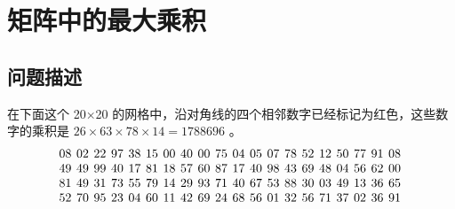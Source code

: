 \section{矩阵中的最大乘积}\label{sec:problem11}
\subsection{问题描述}
\begin{tcolorbox}
	在下面这个 20×20 的网格中，沿对角线的四个相邻数字已经标记为红色，这些数字的乘积是 \(  26 \times 63 \times 78 \times 14 = 1788696 \) 。
	\begin{equation*}
		\begin{array}{@{\hspace{4pt}}c@{\hspace{4pt}}c@{\hspace{4pt}}c@{\hspace{4pt}}c@{\hspace{4pt}}c@{\hspace{4pt}}c@{\hspace{4pt}}c@{\hspace{4pt}}c@{\hspace{4pt}}c@{\hspace{4pt}}c@{\hspace{4pt}}c@{\hspace{4pt}}c@{\hspace{4pt}}c@{\hspace{4pt}}c@{\hspace{4pt}}c@{\hspace{4pt}}c@{\hspace{4pt}}c@{\hspace{4pt}}c@{\hspace{4pt}}c@{\hspace{4pt}}c}
			08 & 02 & 22 & 97 & 38 & 15 & 00 & 40 & 00                  & 75                  & 04                  & 05                  & 07 & 78 & 52 & 12 & 50 & 77 & 91 & 08 \\
			49 & 49 & 99 & 40 & 17 & 81 & 18 & 57 & 60                  & 87                  & 17                  & 40                  & 98 & 43 & 69 & 48 & 04 & 56 & 62 & 00 \\
			81 & 49 & 31 & 73 & 55 & 79 & 14 & 29 & 93                  & 71                  & 40                  & 67                  & 53 & 88 & 30 & 03 & 49 & 13 & 36 & 65 \\
			52 & 70 & 95 & 23 & 04 & 60 & 11 & 42 & 69                  & 24                  & 68                  & 56                  & 01 & 32 & 56 & 71 & 37 & 02 & 36 & 91 \\

\end{array}
\end{equation*}
\end{tcolorbox}
